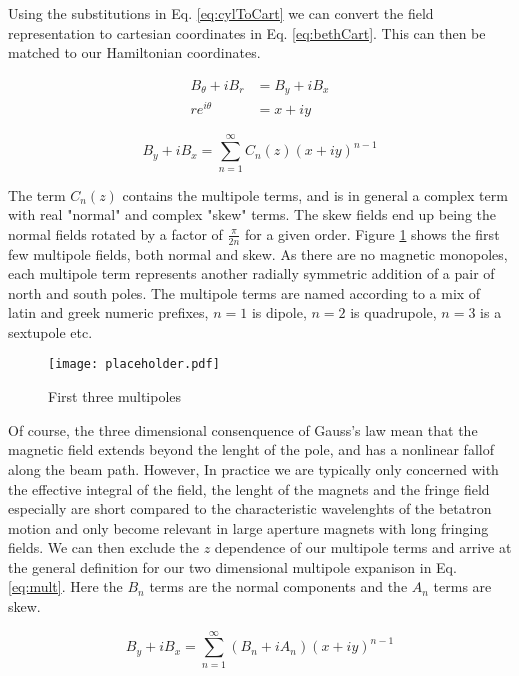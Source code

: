 Using the substitutions in Eq. \ref{eq:cylToCart} we can convert the field representation to cartesian coordinates in Eq. \ref{eq:bethCart}. This can then be matched to our Hamiltonian coordinates.

\begin{equation} \label{eq:cylToCart}
\begin{split}
	B_{\theta} + i B_r &= B_y + i B_x\\
	r e^{i\theta} &= x + iy
\end{split}
\end{equation}

\begin{equation} \label{eq:bethCart}
	B_y + iB_x = \sum_{n=1}^{\infty} C_n(z) (x + iy)^{n-1}
\end{equation}

The term $C_n(z)$ contains the multipole terms, and is in general a complex term with real "normal" and complex "skew" terms. The skew fields end up being the normal fields rotated by a factor of $\frac{\pi}{2n}$ for a given order. Figure \ref{fig:multipoles} shows the first few multipole fields, both normal and skew. As there are no magnetic monopoles, each multipole term represents another radially symmetric addition of a pair of north and south poles. The multipole terms are named according to a mix of latin and greek numeric prefixes, $n=1$ is dipole, $n=2$ is quadrupole, $n=3$ is a sextupole etc.

\begin{figure} \label{fig:multipoles}
	\centering
	\texttt{[image: placeholder.pdf]}
	\caption{First three multipoles}
\end{figure}


Of course, the three dimensional consenquence of Gauss's law mean that the magnetic field extends beyond the lenght of the pole, and has a nonlinear fallof along the beam path. However, In practice we are typically only concerned with the effective integral of the field, the lenght of the magnets and the fringe field especially are short compared to the characteristic wavelenghts of the betatron motion and only become relevant in large aperture magnets with long fringing fields. We can then exclude the $z$ dependence of our multipole terms and arrive at the general definition for our two dimensional multipole expanison in Eq. \ref{eq:mult}. Here the $B_n$ terms are the normal components and the $A_n$ terms are skew. 

\begin{equation} \label{eq:mult}
	B_y + iB_x = \sum_{n=1}^{\infty} (B_n + iA_n) (x + iy)^{n-1}
\end{equation}


